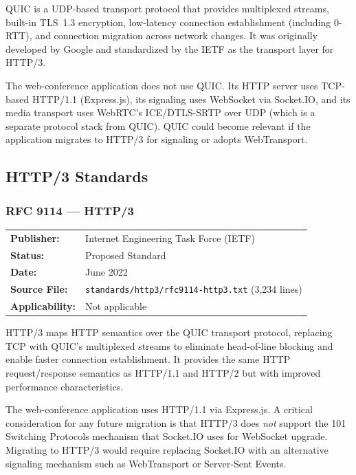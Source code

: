 \documentclass[11pt,letterpaper]{article}
\begin{document}
\vspace{0.5em}
QUIC is a UDP-based transport protocol that provides multiplexed streams, built-in TLS~1.3 encryption, low-latency connection establishment (including 0-RTT), and connection migration across network changes. It was originally developed by Google and standardized by the IETF as the transport layer for HTTP/3.

The web-conference application does not use QUIC. Its HTTP server uses TCP-based HTTP/1.1 (Express.js), its signaling uses WebSocket via Socket.IO, and its media transport uses WebRTC's ICE/DTLS-SRTP over UDP (which is a separate protocol stack from QUIC). QUIC could become relevant if the application migrates to HTTP/3 for signaling or adopts WebTransport.

\subsection{HTTP/3 Standards}
\label{app:http3-standards}

\subsubsection{RFC 9114 --- HTTP/3}
\label{app:rfc9114}

\begin{tabular}{ll}
\textbf{Publisher:} & Internet Engineering Task Force (IETF) \\
\textbf{Status:} & Proposed Standard \\
\textbf{Date:} & June 2022 \\
\textbf{Source File:} & \texttt{standards/http3/rfc9114-http3.txt} (3,234 lines) \\
\textbf{Applicability:} & Not applicable \\
\end{tabular}

\vspace{0.5em}
HTTP/3 maps HTTP semantics over the QUIC transport protocol, replacing TCP with QUIC's multiplexed streams to eliminate head-of-line blocking and enable faster connection establishment. It provides the same HTTP request/response semantics as HTTP/1.1 and HTTP/2 but with improved performance characteristics.

The web-conference application uses HTTP/1.1 via Express.js. A critical consideration for any future migration is that HTTP/3 does \textit{not} support the 101 Switching Protocols mechanism that Socket.IO uses for WebSocket upgrade. Migrating to HTTP/3 would require replacing Socket.IO with an alternative signaling mechanism such as WebTransport or Server-Sent Events.
\end{document}

